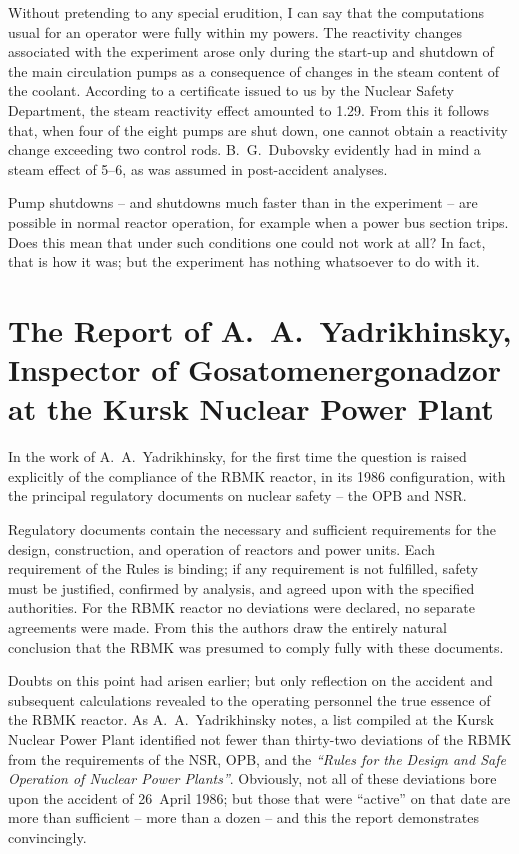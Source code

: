\documentclass[openright]{bookest}
\begin{document}
Without pretending to any special erudition, I can say that the computations usual for an operator were fully within my powers. The reactivity changes associated with the experiment arose only during the start-up and shutdown of the main circulation pumps as a consequence of changes in the steam content of the coolant. According to a certificate issued to us by the Nuclear Safety Department, the steam reactivity effect amounted to \qty{+1.29}{\betaeff}. From this it follows that, when four of the eight pumps are shut down, one cannot obtain a reactivity change exceeding two control rods. B.~G.~Dubovsky evidently had in mind a steam effect of \qtyrange{5}{6}{\betaeff}, as was assumed in post-accident analyses.

Pump shutdowns -- and shutdowns much faster than in the experiment -- are possible in normal reactor operation, for example when a power bus section trips. Does this mean that under such conditions one could not work at all? In fact, that is how it was; but the experiment has nothing whatsoever to do with it.


\section{The Report of A.~A.~Yadrikhinsky, Inspector of Gosatomenergonadzor at the Kursk Nuclear Power Plant}

In the work of A.~A.~Yadrikhinsky, for the first time the question is raised explicitly of the compliance of the RBMK reactor, in its 1986 configuration, with the principal regulatory documents on nuclear safety -- the OPB and NSR.

Regulatory documents contain the necessary and sufficient requirements for the design, construction, and operation of reactors and power units. Each requirement of the Rules is binding; if any requirement is not fulfilled, safety must be justified, confirmed by analysis, and agreed upon with the specified authorities. For the RBMK reactor no deviations were declared, no separate agreements were made. From this the authors draw the entirely natural conclusion that the RBMK was presumed to comply fully with these documents.

Doubts on this point had arisen earlier; but only reflection on the accident and subsequent calculations revealed to the operating personnel the true essence of the RBMK reactor. As A.~A.~Yadrikhinsky notes, a list compiled at the Kursk Nuclear Power Plant identified not fewer than thirty-two deviations of the RBMK from the requirements of the NSR, OPB, and the \textit{``Rules for the Design and Safe Operation of Nuclear Power Plants''}. Obviously, not all of these deviations bore upon the accident of 26~April 1986; but those that were ``active'' on that date are more than sufficient -- more than a dozen -- and this the report demonstrates convincingly.
\end{document}

